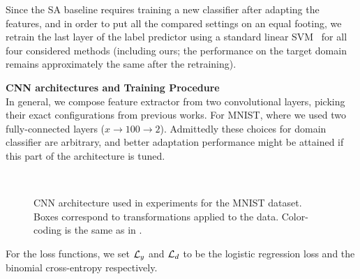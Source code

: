 Since the SA baseline requires training a new classifier after adapting the features, and in order to put all the compared settings on an equal footing, we retrain the last layer of the label predictor using a standard linear SVM~\citep{liblinear} for all four considered methods (including ours; the performance on the target domain remains approximately the same after the retraining). 



\bigskip
\indent\textbf{CNN architectures and Training Procedure}\\
\label{train_proc_for_classification} 
In general, we compose feature extractor from two convolutional layers, picking their exact configurations from previous works. 
For {\sc MNIST}, where we used two fully-connected layers  ($x{\rightarrow}100{\rightarrow}2$).
Admittedly these choices for domain classifier are arbitrary, and better adaptation performance might be attained if this part of the architecture is tuned.

\begin{figure}[t]
  \centering
  \\
  \caption{CNN architecture used in experiments for the MNIST dataset. Boxes correspond to transformations applied to the data. Color-coding is the same as in .}
  \label{fig:exper_archs}
\end{figure}
For the loss functions, we set $ {\mathcal{L}}_y $ and $ {\mathcal{L}}_d $ to be the logistic regression loss and the binomial cross-entropy respectively. %

